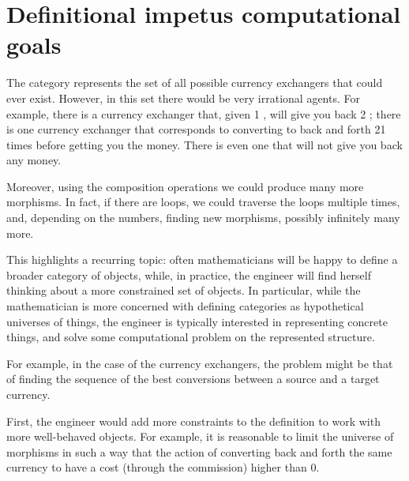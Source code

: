 
\section[Definition \vs computation]{Definitional impetus \vs computational goals }

The category \Curr represents the set of all possible currency exchangers that could ever exist.
However, in this set there would be very irrational agents.
For example, there is a currency exchanger that, given 1 \usd, will give you back 2 \usd;
there is one currency exchanger that corresponds to converting \usd  to \chf back and forth 21 times before getting you the money.
There is even one that will not give you back any money.

Moreover, using the composition operations we could produce many more morphisms.
In fact, if there are loops, we could traverse the loops multiple times, and, depending on the numbers, finding new morphisms, possibly infinitely many more.

This highlights a recurring topic: often mathematicians will be happy to define a broader category of objects, while, in practice, the engineer will find herself thinking about a more constrained set of objects.
In particular, while the mathematician is more concerned with defining categories as hypothetical universes of things, the engineer is typically interested in representing concrete things, and solve some computational problem on the represented structure.

For example, in the case of the currency exchangers, the problem might be that of finding the sequence of the best conversions between a source and a target currency.

First, the engineer would add more constraints to the definition to work with more well-behaved objects.
For example, it is reasonable to limit the universe of morphisms in such a way that the action of converting back and forth the same currency to have a cost (through the commission) higher than 0.

